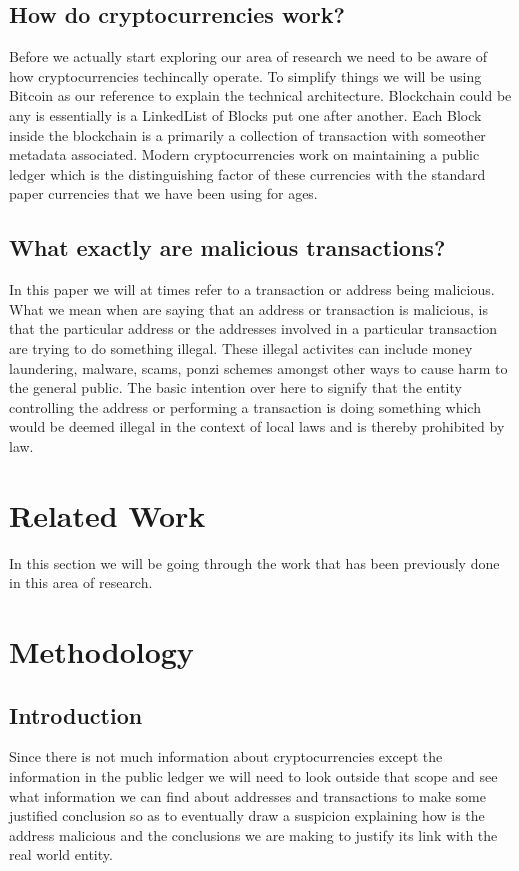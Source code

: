 \documentclass{article}
\begin{document}
\subsection{How do cryptocurrencies work?}
Before we actually start exploring our area of research we need to be aware of how cryptocurrencies techincally operate. To simplify things we will be using Bitcoin as our reference to explain the technical architecture. Blockchain could be any is essentially is a LinkedList \cite{} of Blocks put one after another. 
Each Block inside the blockchain is a primarily a collection of transaction with someother metadata associated.
Modern cryptocurrencies work on maintaining a public ledger which is the distinguishing factor of these currencies with the standard paper currencies that we have been using for ages. 
\subsection{What exactly are malicious transactions?}
In this paper we will at times refer to a transaction or address being malicious. What we mean when are saying that an address or transaction is malicious, is that the particular address or the addresses involved in a particular transaction are trying to do something illegal. These illegal activites can include money laundering, malware, scams, ponzi schemes amongst other ways to cause harm to the general public. The basic intention over here to signify that the entity controlling the address or performing a transaction is doing something which would be deemed illegal in the context of local laws and is thereby prohibited by law. 
\pagebreak

\cite{kethineni_cao_2019}
\pagebreak
\section{Related Work}
In this section we will be going through the work that has been previously done in this area of research. 
\pagebreak
\section{Methodology}
 \subsection{Introduction}
    Since there is not much information about cryptocurrencies except the information in the public ledger we will need to look outside that scope and see what information we can find about addresses and transactions to make some justified conclusion so as to eventually draw a suspicion explaining how is the address malicious and the conclusions we are making to justify its link with the real world entity. 
    
\end{document}
